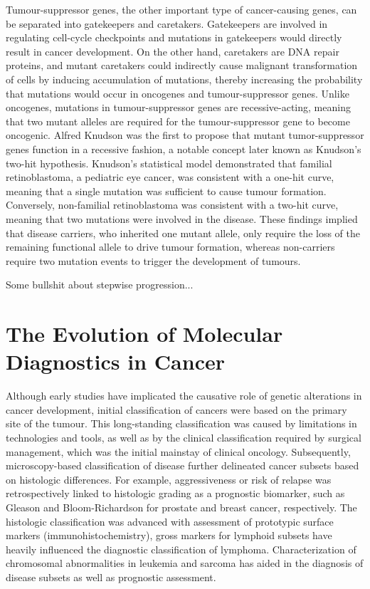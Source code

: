 Tumour-suppressor genes, the other important type of cancer-causing genes, can be separated into gatekeepers and caretakers. Gatekeepers are involved in regulating cell-cycle checkpoints and mutations in gatekeepers would directly result in cancer development. On the other hand, caretakers are DNA repair proteins, and mutant caretakers could indirectly cause malignant transformation of cells by inducing accumulation of mutations, thereby increasing the probability that mutations would occur in oncogenes and tumour-suppressor genes. Unlike oncogenes, mutations in tumour-suppressor genes are recessive-acting, meaning that two mutant alleles are required for the tumour-suppressor gene to become oncogenic. Alfred Knudson was the first to propose that mutant tumor-suppressor genes function in a recessive fashion, a notable concept later known as Knudson's two-hit hypothesis.  Knudson's statistical model demonstrated that familial retinoblastoma, a pediatric eye cancer, was consistent with a one-hit curve, meaning that a single mutation was sufficient to cause tumour formation. Conversely, non-familial retinoblastoma was consistent with a two-hit curve, meaning that two mutations were involved in the disease. These findings implied that disease carriers, who inherited one mutant allele, only require the loss of the remaining functional allele to drive tumour formation, whereas non-carriers require two mutation events to trigger the development of tumours.

Some bullshit about stepwise progression...

\section{The Evolution of Molecular Diagnostics in Cancer}
\label{sec:The Evolution of Molecular Diagnostics in Cancer}

Although early studies have implicated the causative role of genetic alterations in cancer development, initial classification of cancers were based on the primary site of the tumour. This long-standing classification was caused by limitations in technologies and tools, as well as by the clinical classification required by surgical management, which was the initial mainstay of clinical oncology. Subsequently, microscopy-based classification of disease further delineated cancer subsets based on histologic differences. For example, aggressiveness or risk of relapse was retrospectively linked to histologic grading as a prognostic biomarker, such as Gleason and Bloom-Richardson for prostate and breast cancer, respectively. The histologic classification was advanced with assessment of prototypic surface markers (immunohistochemistry), gross markers for lymphoid subsets have heavily influenced the diagnostic classification of lymphoma. Characterization of chromosomal abnormalities in leukemia and sarcoma has aided in the diagnosis of disease subsets as well as prognostic assessment.

